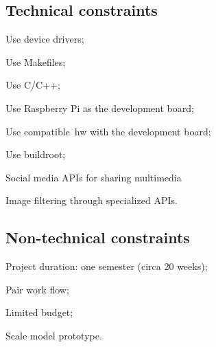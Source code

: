 \subsection{Technical constraints}
\label{sec:techn-constr}
%
\begin{item-c}
\item Use device drivers;
\item Use Makefiles;
\item Use C/C++;
\item Use Raspberry Pi as the development board;
\item Use compatible~\gls{hw} with the development board;
\item Use buildroot;
\item Social media APIs for sharing multimedia
\item Image filtering through specialized APIs.
\end{item-c}
\subsection{Non-technical constraints}
\label{sec:non-techn-constr}

\begin{item-c}
\item Project duration: one semester (circa 20 weeks); 
\item Pair work flow;
\item Limited budget;
\item Scale model prototype.
\end{item-c}


